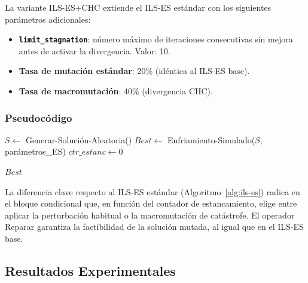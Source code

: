 La variante ILS-ES+CHC extiende el ILS-ES estándar con los siguientes parámetros adicionales:

\begin{itemize}[noitemsep]
  \item \textbf{\texttt{limit\_stagnation}}: número máximo de iteraciones consecutivas sin mejora
  antes de activar la divergencia. Valor: 10.
  \item \textbf{Tasa de mutación estándar}: 20\% (idéntica al ILS-ES base).
  \item \textbf{Tasa de macromutación}: 40\% (divergencia CHC).
\end{itemize}

\subsubsection{Pseudocódigo}

\begin{algorithm}[H]
\SetAlgoLined
{}

$S \leftarrow$ Generar-Solución-Aleatoria()\;
$Best \leftarrow$ Enfriamiento-Simulado($S$, parámetros\_ES)\;
$ctr\_estanc \leftarrow 0$\;

\Return $Best$\;
\caption{ILS-ES con Reinicialización por Catástrofe (CHC/GADEGD)}
\label{alg:ilses_chc}
\end{algorithm}

La diferencia clave respecto al ILS-ES estándar (Algoritmo~\ref{alg:ils-es}) radica en el bloque
condicional que, en función del contador de estancamiento, elige entre aplicar la perturbación
habitual o la macromutación de catástrofe. El operador Reparar garantiza la factibilidad de la
solución mutada, al igual que en el ILS-ES base.

\subsection{Resultados Experimentales}

